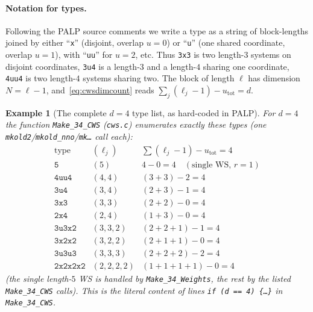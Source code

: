 \documentclass{amsart}
\newtheorem{example}[theorem]{Example}
\begin{document}
\paragraph{Notation for types.} Following the PALP source comments we write a
type as a string of block-lengths joined by either ``\texttt{x}'' (disjoint,
overlap $u=0$) or ``\texttt{u}'' (one shared coordinate, overlap $u=1$), with
``\texttt{uu}'' for $u=2$, etc. Thus \texttt{3x3} is two length-$3$ systems on
disjoint coordinates, \texttt{3u4} is a length-$3$ and a length-$4$ sharing
one coordinate, \texttt{4uu4} is two length-$4$ systems sharing two. The block
of length $\ell$ has dimension $N=\ell-1$, and~\eqref{eq:cwsdimcount} reads
$\sum_j(\ell_j-1)-u_{\mathrm{tot}}=d$.

\begin{example}[The complete $d=4$ type list, as hard-coded in PALP]
\label{ex:cws4types}
For $d=4$ the function \texttt{Make\_34\_CWS} (\texttt{cws.c}) enumerates
\emph{exactly} these types (one \texttt{mkold2}/\texttt{mkold\_nno}/\texttt{mk\dots}
call each):
\[
\begin{array}{lll}
\text{type} & (\ell_j) & \sum(\ell_j{-}1)-u_{\mathrm{tot}}=4\\\hline
\texttt{5}        & (5)        & 4-0=4 \quad(\text{single WS, }r{=}1)\\
\texttt{4uu4}     & (4,4)      & (3{+}3)-2=4\\
\texttt{3u4}      & (3,4)      & (2{+}3)-1=4\\
\texttt{3x3}      & (3,3)      & (2{+}2)-0=4\\
\texttt{2x4}      & (2,4)      & (1{+}3)-0=4\\
\texttt{3u3x2}    & (3,3,2)    & (2{+}2{+}1)-1=4\\
\texttt{3x2x2}    & (3,2,2)    & (2{+}1{+}1)-0=4\\
\texttt{3u3u3}    & (3,3,3)    & (2{+}2{+}2)-2=4\\
\texttt{2x2x2x2}  & (2,2,2,2)  & (1{+}1{+}1{+}1)-0=4
\end{array}
\]
(the single length-$5$ WS is handled by \texttt{Make\_34\_Weights}, the rest by
the listed \texttt{Make\_34\_CWS} calls). This is the literal content of lines
\texttt{if (d == 4)\,\{\dots\}} in \texttt{Make\_34\_CWS}.
\end{example}
\end{document}
